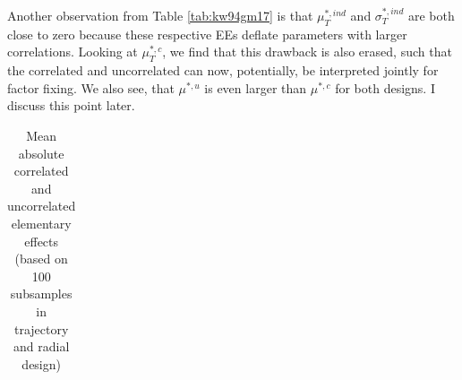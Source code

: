 \documentclass[a4paper,12pt]{article}
\begin{document}
Another observation from Table \ref{tab:kw94gm17} is that $\mu^{*,ind}_T$ and $\sigma^{*,ind}_T$ are both close to zero because these respective EEs deflate parameters with larger correlations. Looking at $\mu^{*,c}_T$, we find that this drawback is also erased, such that the correlated and uncorrelated can now, potentially, be interpreted jointly for factor fixing. We also see, that $\mu^{*,u}$ is even larger than $\mu^{*,c}$ for both designs. I discuss this point later.\\

\noindent




\newpage
\setlength{\tabcolsep}{22pt} %
\begin{table}[H] 
	\centering
	\begin{threeparttable}
		\caption[Model Parametrization]{Mean absolute correlated and uncorrelated elementary effects\\ (based on 100 subsamples in trajectory and radial design)}
		\label{tab:devees}
		\renewcommand{\arraystretch}{1.2}%
		\begin{tabular}{cS[table-format=3.2]S[table-format=3.2]@{\hskip 0.7in}|@{\hskip 0.5in}S[table-format=3.2]S[table-format=3.2]}


\end{tabular}
\end{threeparttable}
\end{table}
\end{document}
